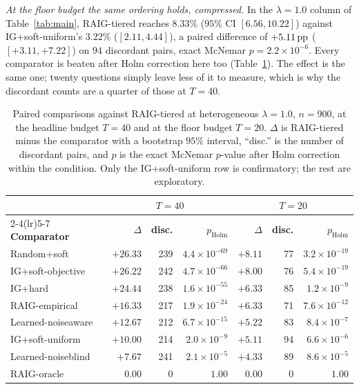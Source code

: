 \emph{At the floor budget the same ordering holds, compressed.} In the
$\lambda = 1.0$ column of Table~\ref{tab:main}, RAIG-tiered reaches $8.33\%$
($95\%$ CI $[6.56, 10.22]$) against IG+soft-uniform's $3.22\%$
($[2.11, 4.44]$), a paired difference of $+5.11\,\text{pp}$ ($[+3.11, +7.22]$) on $94$
discordant pairs, exact McNemar $p = 2.2\times10^{-6}$. Every comparator is
beaten after Holm correction here too (Table~\ref{tab:mcnemar}). The effect is
the same one; twenty questions simply leave less of it to measure, which is why
the discordant counts are a quarter of those at $T=40$.

\begin{table}[t]
\caption{Paired comparisons against RAIG-tiered at heterogeneous
$\lambda = 1.0$, $n = 900$, at the headline budget $T=40$ and at the floor
budget $T=20$. $\Delta$ is RAIG-tiered minus the comparator with a bootstrap
$95\%$ interval, ``disc.'' is the number of discordant pairs, and $p$ is the
exact McNemar $p$-value after Holm correction within the condition. Only the
IG+soft-uniform row is confirmatory; the rest are exploratory.}
\label{tab:mcnemar}
\centering
\tiny
\begin{tabular}{@{}lrrrrrr@{}}
\toprule
& \multicolumn{3}{c}{$T=40$} & \multicolumn{3}{c}{$T=20$} \\
\cmidrule(lr){2-4}\cmidrule(lr){5-7}
\textbf{Comparator} & \textbf{$\Delta$} & \textbf{disc.} &
\textbf{$p_{\text{Holm}}$} & \textbf{$\Delta$} & \textbf{disc.} &
\textbf{$p_{\text{Holm}}$} \\
\midrule
Random+soft        & $+26.33$ & 239 & $4.4\times10^{-69}$ & $+8.11$ & 77 & $3.2\times10^{-19}$ \\
IG+soft-objective  & $+26.22$ & 242 & $4.7\times10^{-66}$ & $+8.00$ & 76 & $5.4\times10^{-19}$ \\
IG+hard            & $+24.44$ & 238 & $1.6\times10^{-55}$ & $+6.33$ & 85 & $1.2\times10^{-9}$  \\
RAIG-empirical     & $+16.33$ & 217 & $1.9\times10^{-24}$ & $+6.33$ & 71 & $7.6\times10^{-12}$ \\
Learned-noiseaware & $+12.67$ & 212 & $6.7\times10^{-15}$ & $+5.22$ & 83 & $8.4\times10^{-7}$  \\
IG+soft-uniform    & $+10.00$ & 214 & $2.0\times10^{-9}$  & $+5.11$ & 94 & $6.6\times10^{-6}$  \\
Learned-noiseblind & $+7.67$  & 241 & $2.1\times10^{-5}$  & $+4.33$ & 89 & $8.6\times10^{-5}$  \\
RAIG-oracle        & $0.00$   & 0   & $1.00$              & $0.00$  & 0  & $1.00$ \\
\bottomrule
\end{tabular}
\end{table}

